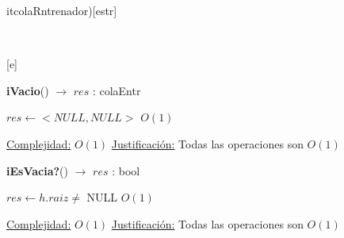 \begin{Representacion}
 
  \begin{Estructura}{itcolaRntrenador)}[estr]
      \begin{Tupla}[estr]%
    \end{Tupla}
  \end{Estructura}


  ~

  [e]{}

\end{Representacion}



\begin{Algoritmos}
   
\begin{algorithm}[H]{\textbf{iVacio}() $\to$ $res$ : colaEntr}
    	\begin{algorithmic}[1]
			 \State $res \gets  <NULL, NULL> $ \Comment $O(1)$

			\medskip
			\Statex \underline{Complejidad:} $O(1)$
			\Statex \underline{Justificaci\'on:} Todas las operaciones son $O(1)$ 
    	\end{algorithmic}
\end{algorithm}
   
\begin{algorithm}[H]{\textbf{iEsVacia?}() $\to$ $res$ : bool}
    	\begin{algorithmic}[1]
			 \State $res \gets  h.raiz \not=$ NULL \Comment $O(1)$

			\medskip
			\Statex \underline{Complejidad:} $O(1)$
			\Statex \underline{Justificaci\'on:} Todas las operaciones son $O(1)$ 
    	\end{algorithmic}
\end{algorithm}


\end{Algoritmos}
